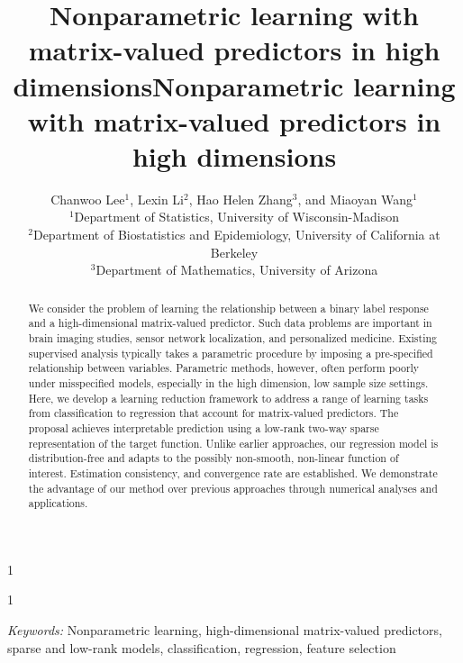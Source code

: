 \documentclass[11pt]{article}
\newcommand{\blind}{1}
\theoremstyle{definition}
\begin{document}
\blind
{   \date{}
  \title{\vspace*{-2cm}\bf Nonparametric learning with matrix-valued predictors in high dimensions}
\author{\vspace*{-.3cm} Chanwoo Lee$^{1}$, Lexin Li$^2$, Hao Helen Zhang$^3$, and Miaoyan Wang$^1$\\\vspace*{-.2cm}
$^1$Department of Statistics, University of Wisconsin-Madison\\
$^2$Department of Biostatistics and Epidemiology, University of California at Berkeley\\
$^3$Department of Mathematics, University of Arizona\\
}

    \maketitle
} \fi

\blind
{
 \date{}
  \title{\vspace*{-2cm}\bf Nonparametric learning with matrix-valued predictors in high dimensions}
\author{}
\maketitle
} \fi




\vspace{-.5cm}
\begin{abstract}
We consider the problem of learning the relationship between a binary label response and a high-dimensional matrix-valued predictor. Such data problems are important in brain imaging studies, sensor network localization, and personalized medicine. Existing supervised analysis typically takes a parametric procedure by imposing a pre-specified relationship between variables. Parametric methods, however, often perform poorly under misspecified models, especially in the high dimension, low sample size settings. Here, we develop a learning reduction framework to address a range of learning tasks from classification to regression that account for matrix-valued predictors. The proposal achieves interpretable prediction using a low-rank two-way sparse representation of the target function. Unlike earlier approaches, our regression model is distribution-free and adapts to the possibly non-smooth, non-linear function of interest. Estimation consistency, and convergence rate are established. We demonstrate the advantage of our method over previous approaches through numerical analyses and applications. 
\end{abstract}
\vspace{-.2cm}
\noindent%
{\it Keywords:}  Nonparametric learning, high-dimensional matrix-valued predictors, sparse and low-rank models, classification, regression, feature selection
\end{document}
